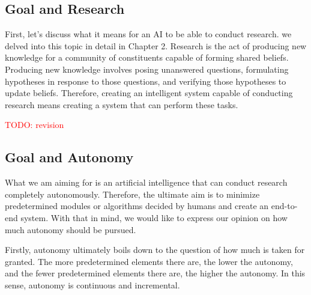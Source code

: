\documentclass{book}
\begin{document}
\subsection{Goal and Research}
First, let's discuss what it means for an AI to be able to conduct research. we delved into this topic in detail in Chapter 2. Research is the act of producing new knowledge for a community of constituents capable of forming shared beliefs. Producing new knowledge involves posing unanswered questions, formulating hypotheses in response to those questions, and verifying those hypotheses to update beliefs. Therefore, creating an intelligent system capable of conducting research means creating a system that can perform these tasks.

\textcolor{red}{TODO: revision}

\subsection{Goal and Autonomy}

What we am aiming for is an artificial intelligence that can conduct research completely autonomously. Therefore, the ultimate aim is to minimize predetermined modules or algorithms decided by humans and create an end-to-end system. With that in mind, we would like to express our opinion on how much autonomy should be pursued.

Firstly, autonomy ultimately boils down to the question of how much is taken for granted. The more predetermined elements there are, the lower the autonomy, and the fewer predetermined elements there are, the higher the autonomy. In this sense, autonomy is continuous and incremental.
\end{document}
